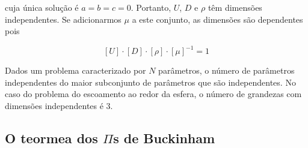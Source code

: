 cuja única solução é $a=b=c=0$. Portanto, $U$, $D$ e $\rho$ têm dimensões independentes. Se adicionarmos $\mu$ a este conjunto, as dimensões são dependentes pois

\[
  [U] \cdot [D] \cdot [\rho] \cdot [\mu]^{-1} = 1
\]

Dados um problema caracterizado por $N$ parâmetros, o número de parâmetros independentes do maior subconjunto de parâmetros que são independentes. No caso do problema do escoamento ao redor da esfera, o número de grandezas com dimensões independentes é 3.




  
  
\subsection{O teormea dos $\Pi$s de Buckinham}
